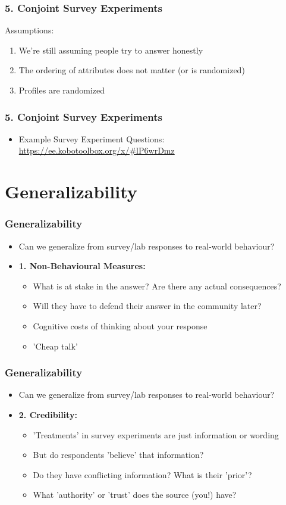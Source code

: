 \documentclass[xcolor=x11names,compress]{beamer}\usepackage[]{graphicx}\usepackage[]{color}
\renewcommand{\(}{\begin{columns}}
\renewcommand{\)}{\end{columns}}
\newcommand{\<}[1]{\begin{column}{#1}}
\renewcommand{\>}{\end{column}}
\begin{document}
\begin{frame}
\frametitle{5. Conjoint Survey Experiments}
Assumptions:
\begin{enumerate}
\item We're still assuming people try to answer honestly
\pause
\item The ordering of attributes does not matter (or is randomized)
\pause
\item Profiles are randomized
\end{enumerate}
\end{frame}

\begin{frame}
\frametitle{5. Conjoint Survey Experiments}
\begin{itemize}
\item Example Survey Experiment Questions: \href{https://ee.kobotoolbox.org/x/#lP6wrDmz}{https://ee.kobotoolbox.org/x/#lP6wrDmz}
\end{itemize}
\end{frame}


\section{Generalizability}

\begin{frame}
\frametitle{Generalizability}
\begin{itemize}
\item Can we generalize from survey/lab responses to real-world behaviour?
\pause
\item \textbf{1. Non-Behavioural Measures:} 
\begin{itemize}
\item What is at stake in the answer? Are there any actual consequences? 
\pause
\item Will they have to defend their answer in the community later?
\pause
\item Cognitive costs of thinking about your response
\pause
\item 'Cheap talk'
\end{itemize}
\end{itemize}
\end{frame}

\begin{frame}
\frametitle{Generalizability}
\begin{itemize}
\item Can we generalize from survey/lab responses to real-world behaviour?
\pause
\item \textbf{2. Credibility:} 
\begin{itemize}
\pause
\item 'Treatments' in survey experiments are just information or wording
\pause
\item But do respondents 'believe' that information?
\pause
\item Do they have conflicting information? What is their 'prior'?
\pause
\item What 'authority' or 'trust' does the source (you!) have?
\end{itemize}
\end{itemize}
\end{frame}
\end{document}
